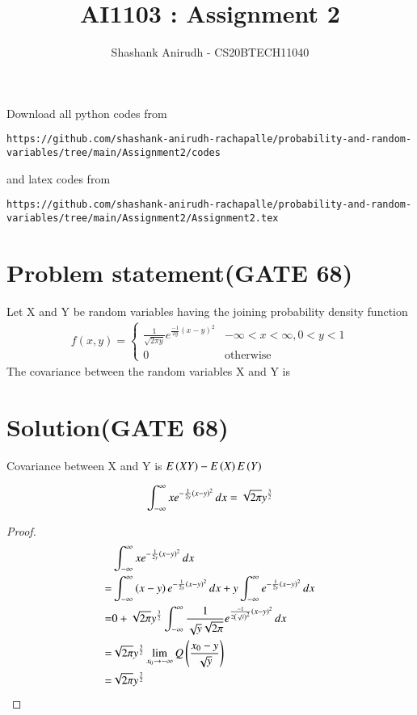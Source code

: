 \documentclass[journal,12pt,twocolumn]{IEEEtran}
\begin{document}
     \def\rightbox#1{\makebox[0in][r]{#1}}
     \def\centbox#1{\makebox[0in]{#1}}
     \def\topbox#1{\raisebox{-\baselineskip}[0in][0in]{#1}}
     \def\midbox#1{\raisebox{-0.5\baselineskip}[0in][0in]{#1}}
\vspace{3cm}
\title{AI1103 : Assignment 2}
\author{Shashank Anirudh - CS20BTECH11040}
\maketitle
\newpage
\bigskip
\renewcommand{\thefigure}{\theenumi}
\renewcommand{\thetable}{\theenumi}
Download all python codes from 
\begin{lstlisting}
https://github.com/shashank-anirudh-rachapalle/probability-and-random-variables/tree/main/Assignment2/codes
\end{lstlisting}
%
and latex codes from 
%
\begin{lstlisting}
https://github.com/shashank-anirudh-rachapalle/probability-and-random-variables/tree/main/Assignment2/Assignment2.tex
\end{lstlisting}
\section*{\textbf{Problem statement(GATE 68)}}
Let X and Y be random variables having the joining probability density function
\begin{align}
f(x,y)=
\begin{cases}
\frac{1}{\sqrt{2\pi y}}e^{\frac{-1}{2y}(x-y)^2} &-\infty<x<\infty,0<y<1\\
0 &\text{otherwise}
\end{cases}
\end{align}
The covariance between the random variables X and Y is\\
\section*{\textbf{Solution(GATE 68)}}
Covariance between X and Y is $E\left(XY\right)-E\left(X\right)E\left(Y\right)$\\

\begin{lemma}
\begin{align}
    \int_{-\infty}^{\infty}xe^{-\frac{1}{2y}\left(x-y\right)^2}\,dx = \sqrt{2\pi}y^\frac{3}{2}
\end{align}
\end{lemma}
\begin{proof}
\begin{align}
    &\int_{-\infty}^{\infty}xe^{-\frac{1}{2y}\left(x-y\right)^2}\,dx\\
  =&\int_{-\infty}^{\infty}\left(x-y\right)e^{-\frac{1}{2y}\left(x-y\right)^2}\,dx+y\int_{-\infty}^{\infty}e^{-\frac{1}{2y}\left(x-y\right)^2}\,dx\\
 =&0+\sqrt{2\pi}y^{\frac{3}{2}}\int_{-\infty}^{\infty}\frac{1}{\sqrt{y}\sqrt{2\pi}}e^{\frac{-1}{2\left(\sqrt{y}\right)^2}\left(x-y\right)^2}\,dx\\
 =&\sqrt{2\pi}y^\frac{3}{2}\lim_{x_0 \to -\infty}Q\left(\frac{x_0 - y}{\sqrt{y}}\right)\\
  =&\sqrt{2\pi}y^\frac{3}{2} \label{eq:4}
\end{align}
\end{proof}
\end{document}
